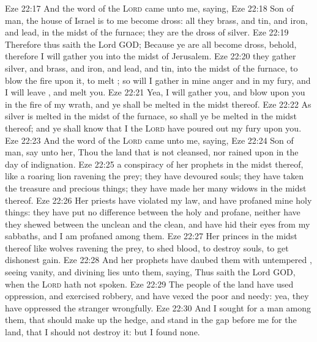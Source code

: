 \vs Eze 22:17 And the word of the \textsc{Lord} came unto me, saying,
\vs Eze 22:18 Son of man, the house of Israel is to me become dross: all they  brass, and tin, and iron, and lead, in the midst of the furnace; they are  the dross of silver.
\vs Eze 22:19 Therefore thus saith the Lord GOD; Because ye are all become dross, behold, therefore I will gather you into the midst of Jerusalem.
\vs Eze 22:20  they gather silver, and brass, and iron, and lead, and tin, into the midst of the furnace, to blow the fire upon it, to melt ; so will I gather  in mine anger and in my fury, and I will leave , and melt you.
\vs Eze 22:21 Yea, I will gather you, and blow upon you in the fire of my wrath, and ye shall be melted in the midst thereof.
\vs Eze 22:22 As silver is melted in the midst of the furnace, so shall ye be melted in the midst thereof; and ye shall know that I the \textsc{Lord} have poured out my fury upon you.
\vs Eze 22:23 And the word of the \textsc{Lord} came unto me, saying,
\vs Eze 22:24 Son of man, say unto her, Thou  the land that is not cleansed, nor rained upon in the day of indignation.
\vs Eze 22:25  a conspiracy of her prophets in the midst thereof, like a roaring lion ravening the prey; they have devoured souls; they have taken the treasure and precious things; they have made her many widows in the midst thereof.
\vs Eze 22:26 Her priests have violated my law, and have profaned mine holy things: they have put no difference between the holy and profane, neither have they shewed  between the unclean and the clean, and have hid their eyes from my sabbaths, and I am profaned among them.
\vs Eze 22:27 Her princes in the midst thereof  like wolves ravening the prey, to shed blood,  to destroy souls, to get dishonest gain.
\vs Eze 22:28 And her prophets have daubed them with untempered , seeing vanity, and divining lies unto them, saying, Thus saith the Lord GOD, when the \textsc{Lord} hath not spoken.
\vs Eze 22:29 The people of the land have used oppression, and exercised robbery, and have vexed the poor and needy: yea, they have oppressed the stranger wrongfully.
\vs Eze 22:30 And I sought for a man among them, that should make up the hedge, and stand in the gap before me for the land, that I should not destroy it: but I found none.
